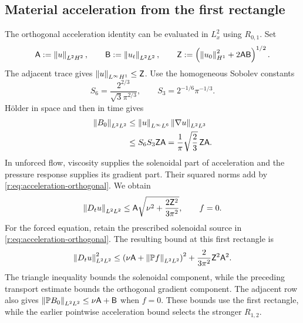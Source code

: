 \subsection{Material acceleration from the first rectangle}

The orthogonal acceleration identity can be evaluated in \(L^2_x\)
using \(R_{0,1}\).  Set
\[
 \mathsf A:=\left\lVert u\right\rVert_{L^2H^2},\qquad
 \mathsf B:=\left\lVert u_t\right\rVert_{L^2L^2},\qquad
 \mathsf Z:=\left(\left\lVert u_0\right\rVert_{H^1}^2
                   +2\mathsf A\mathsf B\right)^{1/2}.
\]
The adjacent trace gives \(\left\lVert u\right\rVert_{L^\infty H^1}\le\mathsf Z\).
Use the homogeneous Sobolev constants
\[
 S_6=\frac{2^{2/3}}{\sqrt3\pi^{2/3}},\qquad
 S_3=2^{-1/6}\pi^{-1/3}.
\]
H\"older in space and then in time gives
\begin{equation}
 \begin{aligned}
 \left\lVert B_0\right\rVert_{L^2L^2}
 &\le\left\lVert u\right\rVert_{L^\infty L^6}\left\lVert \nabla u\right\rVert_{L^2L^3}\\
 &\le S_6S_3\mathsf Z\mathsf A
 =\frac1\pi\sqrt{\frac23}\,\mathsf Z\mathsf A.
 \end{aligned}
 \label{r:eq:first-rectangle-transport-L2}
\end{equation}
In unforced flow, viscosity supplies the solenoidal part of acceleration
and the pressure response supplies its gradient part.  Their squared
norms add by \eqref{r:eq:acceleration-orthogonal}.  We obtain
\begin{equation}
 \left\lVert D_tu\right\rVert_{L^2L^2}
 \le\mathsf A\sqrt{\nu^2+\frac{2\mathsf Z^2}{3\pi^2}},
 \qquad f=0.
 \label{r:eq:first-rectangle-acceleration-L2}
\end{equation}
For the forced equation, retain the prescribed solenoidal source in
\eqref{r:eq:acceleration-orthogonal}. The resulting bound at this first
rectangle is
\begin{equation}
 \left\lVert D_tu\right\rVert_{L^2L^2}^2
 \le\left(\nu\mathsf A+\left\lVert \mathbb P f\right\rVert_{L^2L^2}\right)^2
 +\frac{2}{3\pi^2}\mathsf Z^2\mathsf A^2.
 \label{r:eq:first-rectangle-forced-acceleration-L2}
\end{equation}
The triangle inequality bounds the solenoidal component, while the
preceding transport estimate bounds the orthogonal gradient component.
The adjacent row also gives
\(\left\lVert \mathbb P B_0\right\rVert_{L^2L^2}\le\nu\mathsf A+\mathsf B\) when
\(f=0\).  These bounds use the first rectangle, while the earlier
pointwise acceleration bound selects the stronger \(R_{1,2}\).


